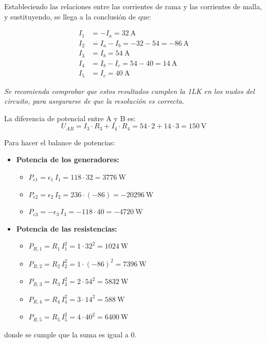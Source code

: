 Estableciendo las relaciones entre las corrientes de rama y las
corrientes de malla, y sustituyendo, se llega a la conclusión de que:

\begin{align*}
  I_1 &= -I_a=\qty{32}{\ampere}\\
  I_2 &= I_a - I_b=-32-54=\qty{-86}{\ampere}\\
  I_3 &= I_b=\qty{54}{\ampere}\\
  I_4 &= I_b - I_c=54-40=\qty{14}{\ampere}\\
  I_5 &= I_c=\qty{40}{\ampere}
\end{align*}

\emph{Se recomienda comprobar que estos resultados cumplen la 1LK en
  los nudos del circuito, para asegurarse de que la resolución es
  correcta.}

La diferencia de potencial entre A y B es:
\begin{equation*}
  U_{AB} = I_3 \cdot R_3 + I_4 \cdot R_4 = 54\cdot 2+14\cdot 3= \qty{150}{\volt}
\end{equation*}

Para hacer el balance de potencias:
\begin{itemize}
\item \textbf{Potencia de los generadores:}
  \begin{itemize}
  \item $P_{\epsilon1}=\epsilon_1\,I_1=118\cdot 32=\qty{3776}{\watt}$
  \item
    $P_{\epsilon2}=\epsilon_2\,I_2=236\cdot (-86)=\qty{-20296}{\watt}$
  \item
    $P_{\epsilon3}=-\epsilon_3\,I_3=-118\cdot 40=\qty{-4720}{\watt}$
  \end{itemize}
\item \textbf{Potencia de las resistencias:}
  \begin{itemize}
  \item $P_{R,1}=R_1\,I_1^2=1\cdot 32^2=\qty{1024}{\watt}$
  \item $P_{R,2}=R_2\,I_2^2=1\cdot (-86)^2=\qty{7396}{\watt}$
  \item $P_{R,3}=R_3\,I_3^2=2\cdot 54^2=\qty{5832}{\watt}$
  \item $P_{R,4}=R_4\,I_4^2=3\cdot 14^2=\qty{588}{\watt}$
  \item $P_{R,5}=R_5\,I_5^2=4\cdot 40^2=\qty{6400}{\watt}$
  \end{itemize}
\end{itemize}
donde se cumple que la suma es igual a 0.

